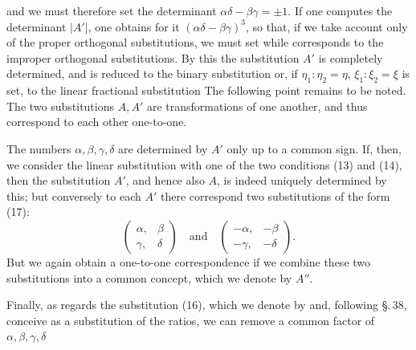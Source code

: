 and we must therefore set the determinant $\alpha\delta - \beta\gamma = \pm 1$.
If one computes the determinant $|A'|$, one obtains for it
$(\alpha\delta - \beta\gamma)^3$, so that, if we take account only
of the proper orthogonal substitutions, we must set
while
corresponds to the improper orthogonal substitutions.
By this the substitution $A'$ is completely determined, and is
reduced to the binary substitution
or, if $\eta_1 : \eta_2 = \eta$, $\xi_1 : \xi_2 = \xi$ is set,
to the linear fractional substitution
The following point remains to be noted. The two substitutions
$A, A'$ are transformations of one another, and thus correspond
to each other one-to-one.

The numbers $\alpha, \beta, \gamma, \delta$ are determined by $A'$
only up to a common sign. If, then, we consider the
linear substitution
with one of the two conditions (13) and (14), then the substitution
$A'$, and hence also $A$, is indeed uniquely determined by this;
but conversely to each $A'$ there correspond two
substitutions of the form (17):
\[
\begin{pmatrix} \alpha, & \beta \\ \gamma, & \delta \end{pmatrix}
\quad\text{and}\quad
\begin{pmatrix} -\alpha, & -\beta \\ -\gamma, & -\delta \end{pmatrix}.
\]
But we again obtain a one-to-one correspondence if we
combine these two substitutions into a common concept, which
we denote by $A''$.

Finally, as regards the substitution (16), which we denote by
and, following \S.\,38, conceive as a substitution of the ratios,
we can remove a common factor of
$\alpha, \beta, \gamma, \delta$
